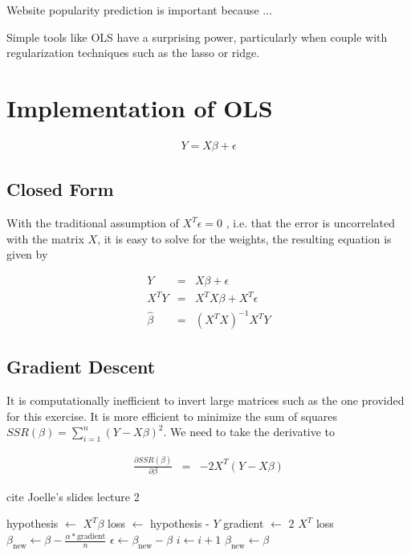 \documentclass[conference]{IEEEtran}
\begin{document}
Website popularity prediction is important because $\ldots$

Simple tools like OLS have a surprising power, particularly when couple with
regularization techniques such as the lasso or ridge.

\section{Implementation of OLS}

\begin{eqnarray}
  Y = X \beta + \epsilon
\end{eqnarray}

\subsection{Closed Form}

With the traditional assumption of $X^T \epsilon = 0$
\cite{davidson2004econometric}, i.e. that the error is 
uncorrelated with the matrix $X$, it is easy to solve for the weights, the
resulting equation is given by

\begin{eqnarray}
  Y &=& X \beta + \epsilon \\
  X^T Y &=& X^T X \beta + X^T \epsilon \\
  \hat{\beta} &=& (X^TX)^{-1}X^TY 
\end{eqnarray}


\subsection{Gradient Descent}

It is computationally inefficient to invert large matrices such as the one
provided for this exercise. It is more efficient to minimize the sum of squares
$SSR(\beta) = \sum_{i=1}^n (Y-X \beta)^2$. We need to take the derivative to 

\begin{eqnarray}
  \frac{\partial SSR(\beta)}{\partial \beta} &=& -2 X^T (Y-X \beta)
\end{eqnarray}

cite Joelle's slides lecture 2

\begin{algorithmic}
    \State hypothesis $\leftarrow$ $X^T \beta$
    \State loss $\leftarrow$ hypothesis - $Y$
    \State gradient $\leftarrow$ 2 $X^T$ loss
    \State $\beta_{\text{new}} \leftarrow \beta - \frac{\alpha *
      \text{gradient}}{n}$  
    \State $\epsilon \leftarrow \beta_{\text{new}} - \beta$
    \State $i \leftarrow i + 1$
    \State $\beta_{\text{new}} \leftarrow \beta$
\EndWhile
\end{algorithmic}
\end{document}
